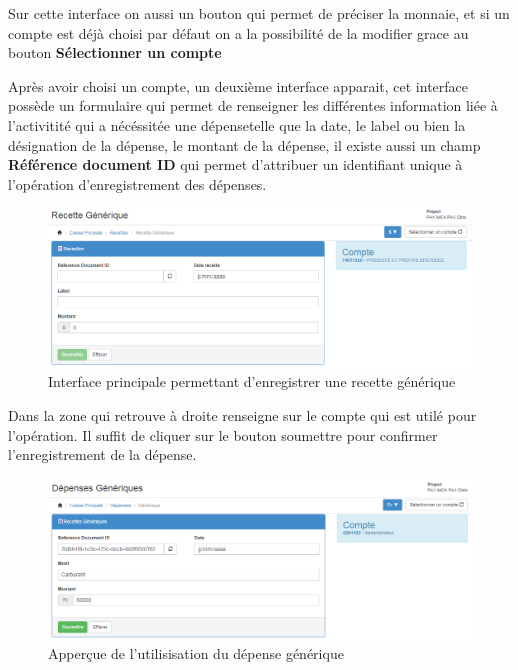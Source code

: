 \documentclass[12pt,a4paper]{report}
\begin{document}
Sur cette interface on aussi un bouton qui permet de préciser la monnaie, et si un compte est déjà choisi par défaut on a la possibilité de la modifier grace au bouton \textbf{Sélectionner un compte}

Après avoir choisi un compte, un deuxième interface apparait, cet interface possède un formulaire qui permet de renseigner les différentes information liée à l'activitité qui a nécéssitée une dépensetelle que la date, le label ou bien la désignation de la dépense, le montant de la dépense, il existe aussi un champ \textbf{Référence document ID} qui permet d'attribuer un identifiant unique à l'opération d'enregistrement des dépenses.

\begin{figure}[h]
\begin{center}
\includegraphics[width=14cm]{pic/recetteGen2.png}
\end{center}
\caption{Interface principale permettant d'enregistrer une recette générique}
\label{Interface principale permettant d'enregistrer une recette générique}
\end{figure}

Dans la zone qui retrouve à droite renseigne sur le compte qui est utilé pour l'opération. Il suffit de cliquer sur le bouton soumettre pour confirmer l'enregistrement de la dépense.

\begin{figure}[h]
\begin{center}
\includegraphics[width=14cm]{pic/FormDepGen.png}
\end{center}
\caption{Apperçue de l'utilisisation du dépense générique}
\label{Apperçue de l'utilisisation du dépense générique}
\end{figure}
\end{document}
